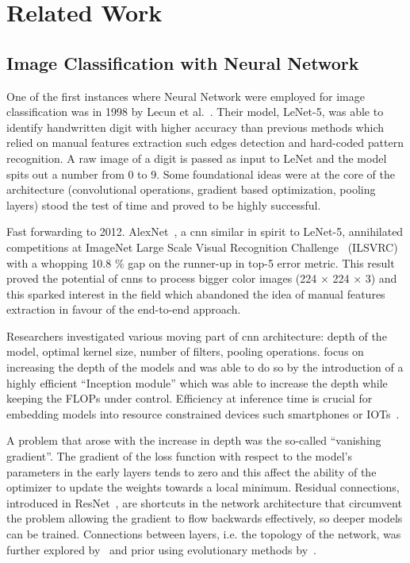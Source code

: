 \chapter{Related Work}
\label{ch:related-work}

\section{Image Classification with Neural Network}
\label{sec:image-classification-with-neural-network}

One of the first instances where Neural Network were employed for image
classification was in 1998 by Lecun et al.~\cite{GradientBasedLecun1998}. Their
model, LeNet-5, was able to identify handwritten digit with higher accuracy
than previous methods which relied on manual features extraction such edges
detection and hard-coded pattern recognition. A raw image of a digit is passed
as input to LeNet and the model spits out a number from 0 to 9. Some
foundational ideas were at the core of the architecture (convolutional
operations, gradient based optimization, pooling layers) stood the test of time
and proved to be highly successful.

Fast forwarding to 2012. AlexNet~\cite{ImagenetClassiKrizhe2017}, a
\acrfull{cnn} similar in spirit to LeNet-5, annihilated competitions at
ImageNet Large Scale Visual Recognition Challenge~\cite{ImagenetALarDeng2009}
(ILSVRC) with a whopping 10.8 \% gap on the runner-up in top-5 error metric.
This result proved the potential of \acrshort{cnn}s to process bigger color
images (224 × 224 × 3) and this sparked interest in the field which abandoned
the idea of manual features extraction in favour of the end-to-end approach.

Researchers investigated various moving part of \acrshort{cnn} architecture:
depth of the model, optimal kernel size, number of filters, pooling operations.
\cite{VeryDeepConvoSimony2014,GoingDeeperWiSzeged2014} focus on increasing the
depth of the models and \cite{GoingDeeperWiSzeged2014} was able to do so by the
introduction of a highly efficient ``Inception module'' which was able to
increase the depth while keeping the FLOPs under control. Efficiency at
inference time is crucial for embedding models into resource constrained
devices such smartphones or IOTs~\cite{SqueezenetAleIandol2016,
MnasnetPlatfoTanM2018, MobilenetsEffHoward2017}.

A problem that arose with the increase in depth was the so-called ``vanishing
gradient''. The gradient of the loss function with respect to the model's
parameters in the early layers tends to zero and this affect the ability of the
optimizer to update the weights towards a local minimum. Residual connections,
introduced in ResNet~\cite{DeepResidualLHeKa2015, IdentityMappinHeKa2016}, are
shortcuts in the network architecture that circumvent the problem allowing the
gradient to flow backwards effectively, so deeper models can be trained.
Connections between layers, i.e. the topology of the network, was further
explored by~\cite{DualPathNetwoChen2017, DenselyConnectHuang2016} and prior
using evolutionary methods by~\cite{DesigningNeuraMiller1989,
EvolvingNeuralStanle2002}.

